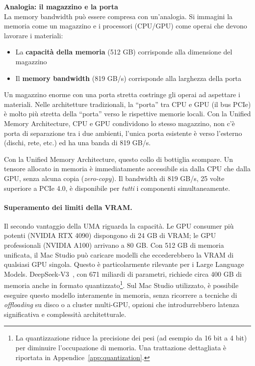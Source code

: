 \begin{notebox}
\textbf{Analogia: il magazzino e la porta}\\[0.5em]
La memory bandwidth può essere compresa con un'analogia. Si immagini la memoria come un magazzino e i processori (CPU/GPU) come operai che devono lavorare i materiali:
\begin{itemize}
    \item La \textbf{capacità della memoria} (512 GB) corrisponde alla dimensione del magazzino
    \item Il \textbf{memory bandwidth} (819 GB/s) corrisponde alla larghezza della porta
\end{itemize}
Un magazzino enorme con una porta stretta costringe gli operai ad aspettare i materiali. Nelle architetture tradizionali, la ``porta'' tra CPU e GPU (il bus PCIe) è molto più stretta della ``porta'' verso le rispettive memorie locali. Con la 
Unified Memory Architecture,
CPU e GPU condividono lo stesso  
magazzino, non c'è porta di separazione tra i due ambienti, l'unica porta esistente è verso l'esterno (dischi, rete, etc.) ed ha una banda di 819 GB/s. 

\end{notebox}
Con la Unified Memory Architecture, questo collo di bottiglia scompare. Un tensore allocato in memoria è immediatamente accessibile sia dalla CPU che dalla GPU, senza alcuna copia (\textit{zero-copy}). Il bandwidth di 819 GB/s, 25 volte superiore a PCIe 4.0, è disponibile per \textit{tutti} i componenti simultaneamente.
\paragraph{Superamento dei limiti della VRAM.}
Il secondo vantaggio della UMA riguarda la capacità. Le GPU consumer più potenti (NVIDIA RTX 4090) dispongono di 24 GB di VRAM; le GPU professionali (NVIDIA A100) arrivano a 80 GB. Con 512 GB di memoria unificata, il Mac Studio può caricare modelli che eccederebbero la VRAM di qualsiasi GPU singola.
Questo è particolarmente rilevante per i Large Language Models. DeepSeek-V3~\parencite{deepseekai2024deepseekv3}, con 671 miliardi di parametri, richiede circa 400 GB di memoria anche in formato quantizzato\footnote{La quantizzazione riduce la precisione dei pesi (ad esempio da 16 bit a 4 bit) per diminuire l'occupazione di memoria. Una trattazione dettagliata è riportata in Appendice~\ref{app:quantization}.}. Sul Mac Studio utilizzato, è possibile eseguire questo modello interamente in memoria, senza ricorrere a tecniche di \textit{offloading} su disco o a cluster multi-GPU, opzioni che introdurrebbero latenza significativa e complessità architetturale.
